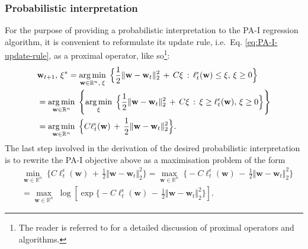 \subsubsection{Probabilistic interpretation}

For the purpose of providing a probabilistic interpretation to the PA-I regression algorithm, it is convenient to reformulate its update rule, i.e.\ Eq. \eqref{eq:PA-I-update-rule}, as a proximal operator, like so\footnote{The reader is referred to \citep{proximal} for a detailed discussion of proximal operators and algorithms.}:
\begin{align}
\label{eq:PA-I-optpb-altform}
	& \mathbf{w}_{t+1},\, \xi^*
	= \operatorname*{arg\,min}_{\mathbf{w}\in\mathbb{R}^n,\; \xi} \; \Big\{\frac{1}{2}\Vert\mathbf{w} - \mathbf{w}_t\Vert_2^2 \, + \, C\xi \, : \, \ell_t^{\epsilon}(\mathbf{w}) \leq \xi,\, \xi \geq 0\Big\}
	\nonumber \\
	&= \operatorname*{arg\,min}_{\mathbf{w}\in\mathbb{R}^n} \; \left\{\operatorname*{arg\,min}_{\xi} \; \Big\{\frac{1}{2}\Vert\mathbf{w} - \mathbf{w}_t\Vert_2^2 \, + \, C\xi \, : \, \xi \geq \ell_t^{\epsilon}(\mathbf{w}),\, \xi \geq 0\Big\}\right\}
	\nonumber \\
	&= \operatorname*{arg\,min}_{\mathbf{w}\in\mathbb{R}^n} \; \Big\{C\ell_t^{\epsilon}(\mathbf{w}) \, + \, \frac{1}{2}\Vert\mathbf{w} - \mathbf{w}_t\Vert_2^2\Big\}.
\end{align}
The last step involved in the derivation of the desired probabilistic interpretation is to rewrite the PA-I objective above as a maximisation problem of the form
\begin{align}
\label{eq:PA-I-optpb}
	& \min_{\mathbf{w}\in\mathbb{R}^n} \; \Big\{C\ell_t^{\epsilon}(\mathbf{w}) \, + \, \frac{1}{2}\Vert\mathbf{w} - \mathbf{w}_t\Vert_2^2\Big\}
	= \max_{\mathbf{w}\in\mathbb{R}^n} \; \Big\{-C\ell_t^{\epsilon}(\mathbf{w}) \, - \, \frac{1}{2}\Vert\mathbf{w} - \mathbf{w}_t\Vert_2^2\Big\}
	\nonumber \\	
	&= \max_{\mathbf{w}\in\mathbb{R}^n} \; \log\left[\exp\Big\{-C\ell_t^{\epsilon}(\mathbf{w}) \, - \, \frac{1}{2}\Vert\mathbf{w} - \mathbf{w}_t\Vert_2^2\Big\}\right].
\end{align}

